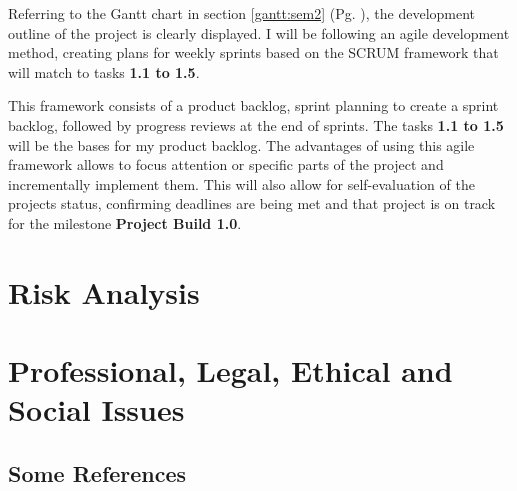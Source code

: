\noindent Referring to the Gantt chart in section \ref{gantt:sem2} (Pg. \pageref{gantt:sem2}), the development outline of the project is clearly displayed. I will be following an agile development method, creating plans for weekly sprints based on the SCRUM framework that will match to tasks \textbf{1.1 to 1.5}. 

This framework consists of a product backlog, sprint planning to create a sprint backlog, followed by progress reviews at the end of sprints. The tasks \textbf{1.1 to 1.5} will be the bases for my product backlog. The advantages of using this agile framework allows to focus attention or specific parts of the project and incrementally implement them. This will also allow for self-evaluation of the projects status, confirming deadlines are being met and that project is on track for the milestone \textbf{Project Build 1.0}.


\section{Risk Analysis}
\label{sec:management:ra}



\section{Professional, Legal, Ethical and Social Issues}
\label{sec:management:plesi}



\subsection{Some References}
\label{sec:management:results:refs}
